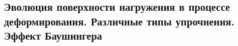 

\subsection{Эволюция поверхности нагружения в процессе деформирования. Различные типы упрочнения. Эффект Баушингера}



